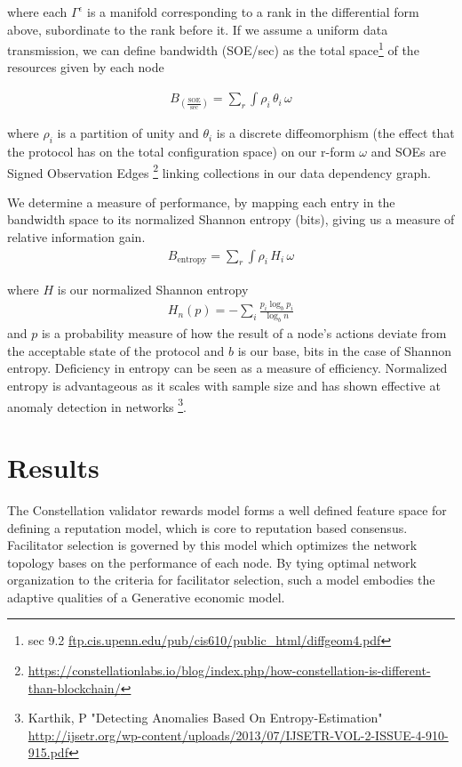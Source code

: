 \documentclass{article}
\begin{document}
where each $\Gamma^{\epsilon}$ is a manifold corresponding to a rank in the differential form above, subordinate to the rank before it. If we assume a uniform data transmission, we can define bandwidth (SOE/sec) as the total space\footnote{sec 9.2 \url{ftp.cis.upenn.edu/pub/cis610/public_html/diffgeom4.pdf}} of the resources given by each node

\begin{equation*} \label{eq1}
\begin{split}
B_{(\frac{\mathrm{SOE}}{\mathrm{sec}})} = \sum_{r} \int \rho_i\, \theta_i\, \omega
\end{split}
\end{equation*}

where $\rho_i$ is a partition of unity and $\theta_i$ is a discrete diffeomorphism (the effect that the protocol has on the total configuration space) on our r-form $\omega$ and SOEs are Signed Observation Edges
\footnote{\url{https://constellationlabs.io/blog/index.php/how-constellation-is-different-than-blockchain/}} 
linking collections in our data dependency graph.

We determine a measure of performance, by mapping each entry in the bandwidth space to its normalized Shannon entropy (bits), giving us a measure of relative information gain.
\begin{equation*} \label{eq1}
\begin{split}
B_\mathrm{entropy} = \sum_{r} \int \rho_i\, H_i\, \omega 
\end{split}
\end{equation*}

where $H$ is our normalized Shannon entropy
\begin{equation*} \label{eq1}
\begin{split}
H_n(p) = - \sum_i \frac{p_i \log_b p_i}{\log_b n}
\end{split}
\end{equation*}
and $p$ is a probability measure of how the result of a node's actions deviate from the acceptable state of the protocol and $b$ is our base, bits in the case of Shannon entropy. Deficiency in entropy can be seen as a measure of efficiency. Normalized entropy is advantageous as it scales with sample size and has shown effective at anomaly detection in networks
\footnote{Karthik, P "Detecting Anomalies Based On Entropy-Estimation"\\ \url{http://ijsetr.org/wp-content/uploads/2013/07/IJSETR-VOL-2-ISSUE-4-910-915.pdf}}.

\section{Results}
The Constellation validator rewards model forms a well defined feature space for defining a reputation model, which is core to reputation based consensus. Facilitator selection is governed by this model which optimizes the network topology bases on the performance of each node. By tying optimal network organization to the criteria for facilitator selection, such a model embodies the adaptive qualities of a Generative economic model.
\end{document}
